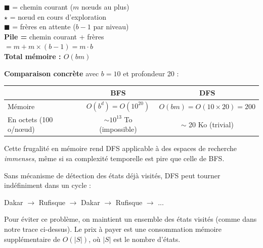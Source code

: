 \documentclass[11pt,a4paper]{article}
\begin{document}
\begin{center}
\hspace{0.5cm}
\begin{minipage}{0.55\textwidth}
{\small
\textcolor{purple!50}{$\blacksquare$} = chemin courant ($m$ nœuds au plus)\\
$\star$ = nœud en cours d'exploration\\
\textcolor{orange!50}{$\blacksquare$} = frères en attente ($b{-}1$ par niveau)\\[0.2cm]
\textbf{Pile =} chemin courant + frères\\
$= m + m \times (b-1) = m \cdot b$\\[0.2cm]
\textbf{Total mémoire : $O(bm)$}
}
\end{minipage}
\end{center}

\textbf{Comparaison concrète} avec $b = 10$ et profondeur 20 :
\begin{center}
\begin{tabular}{lcc}
\toprule
& \textbf{BFS} & \textbf{DFS} \\
\midrule
Mémoire & $O(b^d) = O(10^{20})$ & $O(bm) = O(10 \times 20) = 200$ \\
En octets (100 o/nœud) & $\sim 10^{13}$ To (impossible) & $\sim$ 20 Ko (trivial) \\
\bottomrule
\end{tabular}
\end{center}

Cette frugalité en mémoire rend DFS applicable à des espaces de recherche \textit{immenses}, même si sa complexité temporelle est pire que celle de BFS.

\begin{attentionbox}
Sans mécanisme de détection des états déjà visités, DFS peut tourner indéfiniment dans un cycle :

Dakar $\rightarrow$ Rufisque $\rightarrow$ Dakar $\rightarrow$ Rufisque $\rightarrow$ ...

Pour éviter ce problème, on maintient un ensemble des états visités (comme dans notre trace ci-dessus). Le prix à payer est une consommation mémoire supplémentaire de $O(|S|)$, où $|S|$ est le nombre d'états.
\end{attentionbox}
\end{document}
